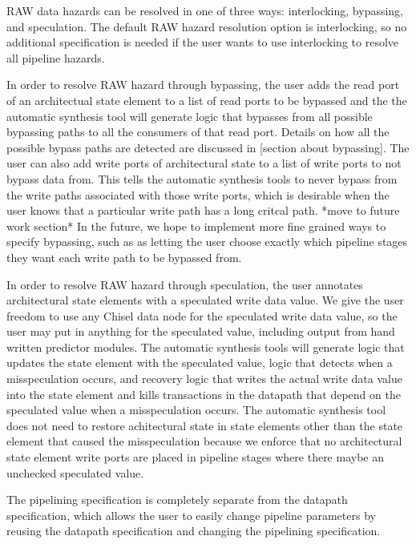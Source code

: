 RAW data hazards can be resolved in one of three ways: interlocking, bypassing, and speculation. The default RAW hazard resolution option is interlocking, so no additional specification is needed if the user wants to use interlocking to resolve all pipeline hazards. 

In order to resolve RAW hazard through bypassing, the user adds the read port of an architectual state element to a list of read ports to be bypassed and the the automatic synthesis tool will generate logic that bypasses from all possible bypassing paths to all the consumers of that read port. Details on how all the possible bypass paths are detected are discussed in [section about bypassing]. The user can also add write ports of architectural state to a list of write ports to not bypass data from. This tells the automatic synthesis tools to never bypass from the write paths associated with those write ports, which is desirable when the user knows that a particular write path has a long critcal path. *move to future work section* In the future, we hope to implement more fine grained ways to specify bypassing, such as as letting the user choose exactly which pipeline stages they want each write path to be bypassed from.

In order to resolve RAW hazard through speculation, the user annotates architectural state elements with a speculated write data value. We give the user freedom to use any Chisel data node for the speculated write data value, so the user may put in anything for the speculated value, including output from hand written predictor modules. The automatic synthesis tools will generate logic that updates the state element with the speculated value, logic that detects when a misspeculation occurs, and recovery logic that writes the actual write data value into the state element and kills transactions in the datapath that depend on the speculated value when a misspeculation occurs. The automatic synthesis tool does not need to restore achitectural state in state elements other than the state element that caused the misspeculation because we enforce that no architectural state element write ports are placed in pipeline stages where there maybe an unchecked speculated value.

The pipelining specification is completely separate from the datapath specification, which allows the user to easily change pipeline parameters by reusing the datapath specification and changing the pipelining specification.

